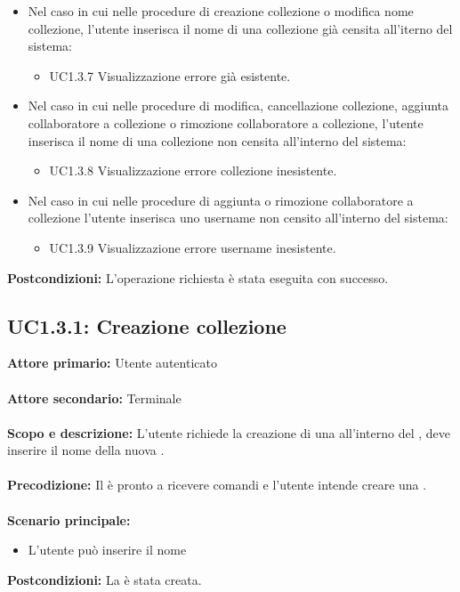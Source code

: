 \documentclass{scalatekids-article}
\begin{document}
\begin{itemize}
\item Nel caso in cui nelle procedure di creazione collezione o modifica nome collezione, l'utente inserisca il nome di una collezione già censita all'iterno del sistema:
  \begin{itemize}
  \item UC1.3.7 Visualizzazione errore  già esistente.
  \end{itemize}
\item Nel caso in cui nelle procedure di modifica, cancellazione collezione, aggiunta collaboratore a collezione o rimozione collaboratore a collezione, l'utente inserisca il nome di una collezione non censita all'interno del sistema:
  \begin{itemize}
  \item UC1.3.8 Visualizzazione errore collezione inesistente.
  \end{itemize}
\item Nel caso in cui nelle procedure di aggiunta o rimozione collaboratore a collezione l'utente inserisca uno username non censito all'interno del sistema:
  \begin{itemize}
  \item UC1.3.9 Visualizzazione errore username inesistente.
  \end{itemize}
\end{itemize}
\textbf{Postcondizioni:} L'operazione richiesta è stata eseguita con successo.

\subsection{UC1.3.1: Creazione collezione}

\textbf{Attore primario:} Utente autenticato\\ \\
\textbf{Attore secondario:} Terminale\\ \\
\textbf{Scopo e descrizione:} L'utente richiede la creazione di una  all'interno del , deve inserire il nome della nuova .\\ \\
\textbf{Precodizione:} Il  è pronto a ricevere comandi e l'utente intende creare una .\\ \\
\textbf{Scenario principale:}
\begin{itemize}
  \item L'utente può inserire il nome  %
\end{itemize}
\textbf{Postcondizioni:} La  è stata creata.
\end{document}
